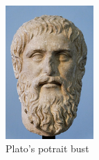 \documentclass[11pt]{article}
\begin{document}


		\begin{figure}[ht]
			\centering
			\includegraphics[width=0.3\textwidth, keepaspectratio]{images/plato_bust.jpg}
			\caption{Plato's potrait bust}
			\label{img:platobust}
		\end{figure}

\end{document}
